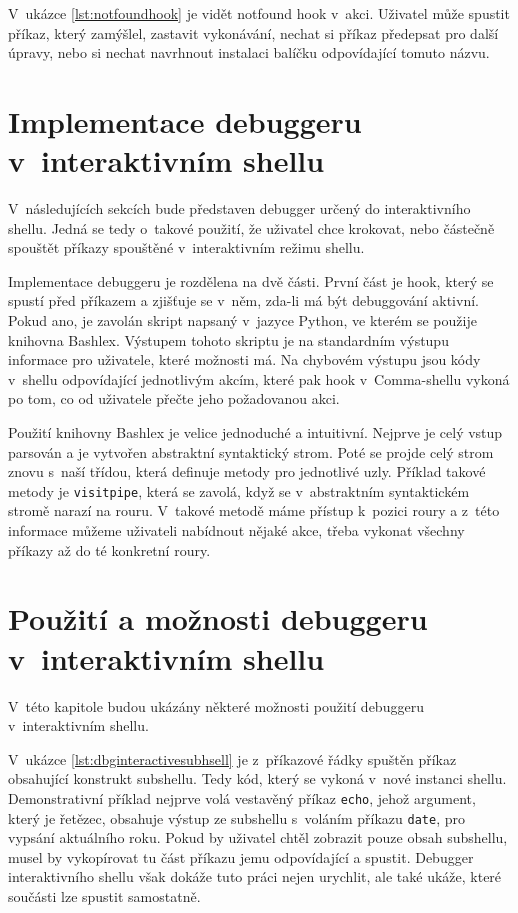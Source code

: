 \documentclass[thesis=M,czech]{FITthesis}[2012/06/26]
\begin{document}
V~ukázce \ref{lst:notfoundhook} je vidět notfound hook v~akci. Uživatel může spustit příkaz, který zamýšlel, zastavit vykonávání, nechat si příkaz předepsat pro další úpravy,  nebo si nechat navrhnout instalaci balíčku odpovídající tomuto názvu.

%
%
%
%
%
\section{Implementace debuggeru v~interaktivním shellu}

V~následujících sekcích bude představen debugger určený do interaktivního shellu. Jedná se tedy o~takové použití, že uživatel chce krokovat, nebo částečně spouštět příkazy spouštěné v~interaktivním režimu shellu.

Implementace debuggeru je rozdělena na dvě části. První část je hook, který se spustí před příkazem a zjišťuje se v~něm, zda-li má být debuggování aktivní. Pokud ano, je zavolán skript napsaný v~jazyce Python, ve kterém se použije knihovna Bashlex. Výstupem tohoto skriptu je na standardním výstupu informace pro uživatele, které možnosti má. Na chybovém výstupu jsou kódy v~shellu odpovídající jednotlivým akcím, které pak hook v~Comma-shellu vykoná po tom, co od uživatele přečte jeho požadovanou akci.

Použití knihovny Bashlex je velice jednoduché a intuitivní. Nejprve je celý vstup parsován a je vytvořen abstraktní syntaktický strom. Poté se projde celý strom znovu s~naší třídou, která definuje metody pro jednotlivé uzly. Příklad takové metody je \texttt{visitpipe}, která se zavolá, když se v~abstraktním syntaktickém stromě narazí na rouru. V~takové metodě máme přístup k~pozici roury a z~této informace můžeme uživateli nabídnout nějaké akce, třeba vykonat všechny příkazy až do té konkretní roury.


\section{Použití a možnosti debuggeru v~interaktivním shellu}

V~této kapitole budou ukázány některé možnosti použití debuggeru v~interaktivním shellu.

V~ukázce \ref{lst:dbginteractivesubhsell} je z~příkazové řádky spuštěn příkaz obsahující konstrukt subshellu. Tedy kód, který se vykoná v~nové instanci shellu. Demonstrativní příklad nejprve volá vestavěný příkaz \texttt{echo}, jehož argument, který je řetězec, obsahuje výstup ze subshellu s~voláním příkazu \texttt{date}, pro vypsání aktuálního roku. Pokud by uživatel chtěl zobrazit pouze obsah subshellu, musel by vykopírovat tu část příkazu jemu odpovídající a spustit. Debugger interaktivního shellu však dokáže tuto práci nejen urychlit, ale také ukáže, které součásti lze spustit samostatně.
\end{document}
